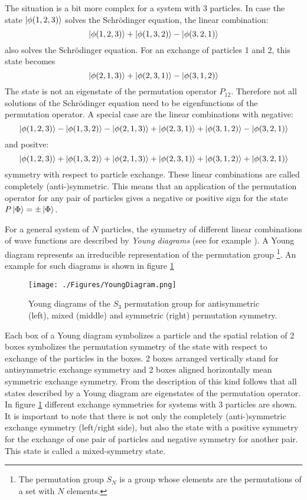 The situation is a bit more complex for a system with 3 particles. In case the state $\ket{\phi(1,2,3)}$ solves the Schrödinger equation, the linear combination:
\begin{equation}
 \ket{\phi(1,2,3)} + \ket{\phi(1,3,2)} - \ket{\phi(3,2,1)}
\end{equation} 
also solves the Schrödinger equation. For an exchange of particles 1 and 2, this state becomes
\begin{equation}
 \ket{\phi(2,1,3)} + \ket{\phi(2,3,1)} - \ket{\phi(3,1,2)}
\end{equation} 
The state is not an eigenstate of the permutation operator $P_{12}$. Therefore not all solutions of the Schrödinger equation need to be eigenfunctions of the permutation operator. A special case are the linear combinations with negative:
\begin{equation}
 \ket{\phi(1,2,3)} - \ket{\phi(1,3,2)} - \ket{\phi(2,1,3)} + \ket{\phi(2,3,1)} + \ket{\phi(3,1,2)} - \ket{\phi(3,2,1)}
\end{equation} 
and positve:
\begin{equation}
 \ket{\phi(1,2,3)} + \ket{\phi(1,3,2)} + \ket{\phi(2,1,3)} + \ket{\phi(2,3,1)} + \ket{\phi(3,1,2)} + \ket{\phi(3,2,1)}
\end{equation} 
symmetry with respect to particle exchange. These linear combinations are called completely (anti-)symmetric. This means that an application of the permutation operator for any pair of particles gives a negative or positive sign for the state $P\ket{\Phi}=\pm\ket{\Phi}$.

For a general system of $N$ particles, the symmetry of different linear combinations of wave functions are described by \textit{Young diagrams} (see for example \cite{Kaplan2013}). A Young diagram represents an irreducible representation of the permutation group \footnote{The permutation group $S_{N}$ is a group whose elements are the permutations of a set with $N$ elements.}. An example for such diagrams is shown in figure \ref{fig:YoungDiag}
\begin{figure}[h]
 \centering
 \texttt{[image: ./Figures/YoungDiagram.png]}
 \caption{Young diagrams of the $S_{3}$ permutation group for antisymmetric (left), mixed (middle) and symmetric (right) permutation symmetry.}
 \label{fig:YoungDiag}
\end{figure}
Each box of a Young diagram symbolizes a particle and the spatial relation of 2 boxes symbolizes the permutation symmetry of the state with respect to exchange of the particles in the boxes. 2 boxes arranged vertically stand for antisymmetric exchange symmetry and 2 boxes aligned horizontally mean symmetric exchange symmetry. From the description of this kind follows that all states described by a Young diagram are eigenstates of the permutation operator. In figure \ref{fig:YoungDiag} different exchange symmetries for systems with 3 particles are shown. It is important to note that there is not only the completely (anti-)symmetric exchange symmetry (left/right side), but also the state with a positive symmetry for the exchange of one pair of particles and negative symmetry for another pair. This state is called a mixed-symmetry state.


